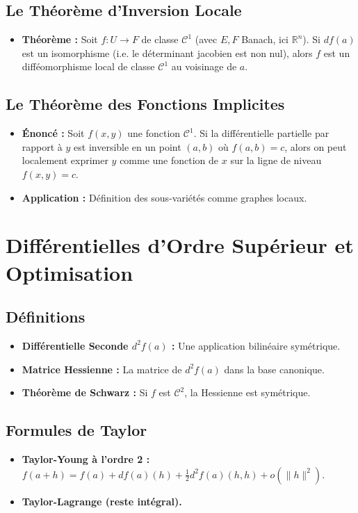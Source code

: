 \documentclass[12pt, a4paper, parskip=full]{report}
\theoremstyle{agregstyle}
\begin{document}
\subsection{Le Théorème d'Inversion Locale}
\begin{itemize}
    \item \textbf{Théorème :} Soit $f: U \to F$ de classe $\mathcal{C}^1$ (avec $E,F$ Banach, ici $\mathbb{R}^n$). Si $df(a)$ est un isomorphisme (i.e. le déterminant jacobien est non nul), alors $f$ est un difféomorphisme local de classe $\mathcal{C}^1$ au voisinage de $a$.
\end{itemize}
\subsection{Le Théorème des Fonctions Implicites}
\begin{itemize}
    \item \textbf{Énoncé :} Soit $f(x,y)$ une fonction $\mathcal{C}^1$. Si la différentielle partielle par rapport à $y$ est inversible en un point $(a,b)$ où $f(a,b)=c$, alors on peut localement exprimer $y$ comme une fonction de $x$ sur la ligne de niveau $f(x,y)=c$.
    \item \textbf{Application :} Définition des sous-variétés comme graphes locaux.
\end{itemize}

\section{Différentielles d'Ordre Supérieur et Optimisation}
\subsection{Définitions}
\begin{itemize}
    \item \textbf{Différentielle Seconde $d^2f(a)$ :} Une application bilinéaire symétrique.
    \item \textbf{Matrice Hessienne :} La matrice de $d^2f(a)$ dans la base canonique.
    \item \textbf{Théorème de Schwarz :} Si $f$ est $\mathcal{C}^2$, la Hessienne est symétrique.
\end{itemize}
\subsection{Formules de Taylor}
\begin{itemize}
    \item \textbf{Taylor-Young à l'ordre 2 :} $f(a+h) = f(a) + df(a)(h) + \frac{1}{2}d^2f(a)(h,h) + o(\|h\|^2)$.
    \item \textbf{Taylor-Lagrange (reste intégral).}
\end{itemize}
\end{document}
